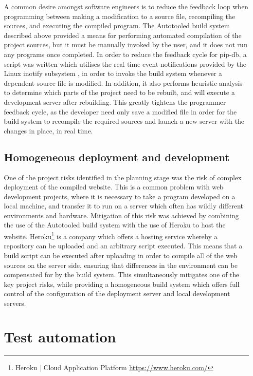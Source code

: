 A common desire amongst software engineers is to reduce the feedback
loop when programming between making a modification to a source file,
recompiling the sources, and executing the compiled program. The
Autotooled build system described above provided a means for
performing automated compilation of the project sources, but it must
be manually invoked by the user, and it does not run any programs once
completed. In order to reduce the feedback cycle for pip-db, a script
was written which utilises the real time event notifications provided
by the Linux inotify subsystem \cite{love2005kernel,
  shields2010inotify}, in order to invoke the build system whenever a
dependent source file is modified. In addition, it also performs
heuristic analysis to determine which parts of the project need to be
rebuilt, and will execute a development server after rebuilding. This
greatly tightens the programmer feedback cycle, as the developer need
only save a modified file in order for the build system to recompile
the required sources and launch a new server with the changes in
place, in real time.

\subsection{Homogeneous deployment and development}\label{subsec:deployment}

One of the project risks identified in the planning stage was the risk
of complex deployment of the compiled website. This is a common
problem with web development projects, where it is necessary to take a
program developed on a local machine, and transfer it to run on a
server which often has wildly different environments and
hardware. Mitigation of this risk was achieved by combining the use of
the Autotooled build system with the use of Heroku to host the
website. Heroku\footnote{Heroku | Cloud Application Platform
  \url{https://www.heroku.com/}} is a company which offers a hosting
service whereby a repository can be uploaded and an arbitrary script
executed. This means that a build script can be executed after
uploading in order to compile all of the web sources on the server
side, ensuring that differences in the environment can be compensated
for by the build system. This simultaneously mitigates one of the key
project risks, while providing a homogeneous build system which offers
full control of the configuration of the deployment server and local
development servers.

\section{Test automation}\label{sec:test-automation}

